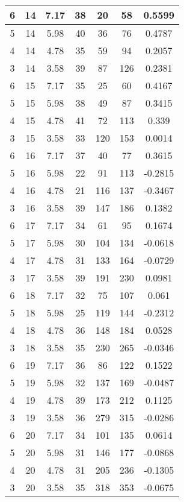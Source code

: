 \documentclass[letterpaper, 12pt]{article}
\begin{document}
\begin{longtable}{|c|c|c|c|c|c|c|}
\hline
6 & 14 & 7.17 & 38 & 20 & 58 & 0.5599 \\
\hline
5 & 14 & 5.98 & 40 & 36 & 76 & 0.4787 \\
\hline
4 & 14 & 4.78 & 35 & 59 & 94 & 0.2057 \\
\hline
3 & 14 & 3.58 & 39 & 87 & 126 & 0.2381 \\
\hline
6 & 15 & 7.17 & 35 & 25 & 60 & 0.4167 \\
\hline
5 & 15 & 5.98 & 38 & 49 & 87 & 0.3415 \\
\hline
4 & 15 & 4.78 & 41 & 72 & 113 & 0.339 \\
\hline
3 & 15 & 3.58 & 33 & 120 & 153 & 0.0014 \\
\hline
6 & 16 & 7.17 & 37 & 40 & 77 & 0.3615 \\
\hline
5 & 16 & 5.98 & 22 & 91 & 113 & -0.2815 \\
\hline
4 & 16 & 4.78 & 21 & 116 & 137 & -0.3467 \\
\hline
3 & 16 & 3.58 & 39 & 147 & 186 & 0.1382 \\
\hline
6 & 17 & 7.17 & 34 & 61 & 95 & 0.1674 \\
\hline
5 & 17 & 5.98 & 30 & 104 & 134 & -0.0618 \\
\hline
4 & 17 & 4.78 & 31 & 133 & 164 & -0.0729 \\
\hline
3 & 17 & 3.58 & 39 & 191 & 230 & 0.0981 \\
\hline
6 & 18 & 7.17 & 32 & 75 & 107 & 0.061 \\
\hline
5 & 18 & 5.98 & 25 & 119 & 144 & -0.2312 \\
\hline
4 & 18 & 4.78 & 36 & 148 & 184 & 0.0528 \\
\hline
3 & 18 & 3.58 & 35 & 230 & 265 & -0.0346 \\
\hline
6 & 19 & 7.17 & 36 & 86 & 122 & 0.1522 \\
\hline
5 & 19 & 5.98 & 32 & 137 & 169 & -0.0487 \\
\hline
4 & 19 & 4.78 & 39 & 173 & 212 & 0.1125 \\
\hline
3 & 19 & 3.58 & 36 & 279 & 315 & -0.0286 \\
\hline
6 & 20 & 7.17 & 34 & 101 & 135 & 0.0614 \\
\hline
5 & 20 & 5.98 & 31 & 146 & 177 & -0.0868 \\
\hline
4 & 20 & 4.78 & 31 & 205 & 236 & -0.1305 \\
\hline
3 & 20 & 3.58 & 35 & 318 & 353 & -0.0675 \\
\hline
\end{longtable}
\end{document}
